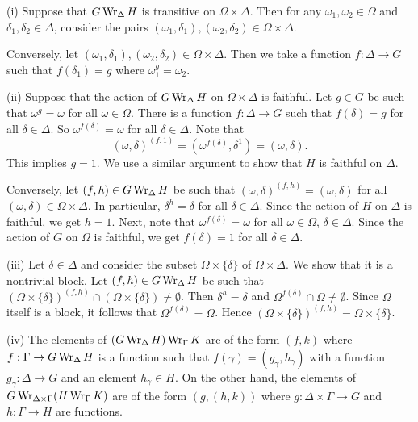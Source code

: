 \begin{sketch}
	(i) Suppose that $G\operatorname{Wr}_\Delta H$ is transitive on $\Omega\times \Delta$. Then for any $\omega_1,\omega_2\in \Omega$ and $\delta_1,\delta_2\in \Delta$, consider the pairs $(\omega_1,\delta_1),(\omega_2,\delta_2) \in \Omega\times\Delta$. 
	
	Conversely, let $(\omega_1,\delta_1),(\omega_2,\delta_2) \in \Omega\times\Delta$. Then we take a function $f:\Delta \to G$ such that $f(\delta_1)=g$ where $\omega_1^g =\omega_2$.
	
	(ii) Suppose that the action of $G\operatorname{Wr}_\Delta H$ on $\Omega\times \Delta$ is faithful. Let $g\in G$ be such that $\omega^g = \omega$ for all $\omega\in \Omega$. There is a function $f:\Delta\to G$ such that $f(\delta) = g$ for all $\delta\in \Delta$. So $\omega^{f(\delta)} = \omega$ for all $\delta\in \Delta$. Note that
	\begin{equation*}
		(\omega,\delta)^{(f,1)} = (\omega^{f(\delta)}, \delta^1) = 	(\omega,\delta).
	\end{equation*} This implies $g  = 1$. We use a similar argument to show that $H$ is faithful on $\Delta$.
	
	Conversely, let $(f,h)\in G\operatorname{Wr}_{\Delta} H$ be such that  $(\omega,\delta)^{(f,h)} = (\omega,\delta)$ for all $(\omega,\delta)\in\Omega\times \Delta$. In particular, $\delta^h = \delta$ for all $\delta\in \Delta$. Since the action of $H$ on $\Delta$ is faithful, we get $h = 1$. Next, note that $\omega^{f(\delta)} = \omega$ for all $\omega\in\Omega$, $\delta\in\Delta$. Since the action of $G$ on $\Omega$ is faithful, we get $f(\delta) = 1$ for all $\delta\in\Delta$.
	
	(iii) Let $\delta\in \Delta$ and consider the subset $\Omega\times \{\delta\}$ of $\Omega\times \Delta$. We show that it is a nontrivial block. Let $(f,h)\in G\operatorname{Wr}_{\Delta} H$ be  such that $(\Omega\times \{\delta\})^{(f,h)} \cap (\Omega\times \{\delta\}) \neq \emptyset$. Then $\delta^h = \delta$ and $\Omega^{f(\delta)} \cap \Omega \neq \emptyset$. Since $\Omega$ itself is a block, it follows that $\Omega^{f(\delta)} =\Omega$. Hence $(\Omega\times \{\delta\})^{(f,h)} = \Omega\times \{\delta\}$.
	
	(iv) The elements of $(G\operatorname{Wr}_\Delta H) \operatorname{Wr}_\Gamma K$ are of the form $(f,k)$ where $f:\Gamma\to G\operatorname{Wr}_\Delta H$ is a function such that $f(\gamma) = (g_\gamma,h_\gamma)$ with a function $g_\gamma:\Delta\to G$ and an element $h_\gamma\in H$. On the other hand, the elements of $G\operatorname{Wr}_{\Delta\times \Gamma} (H \operatorname{Wr}_\Gamma K)$ are of the form $(g,(h,k))$ where $g:\Delta\times\Gamma\to G$ and $h:\Gamma \to H$ are functions. 
	

\end{sketch}
